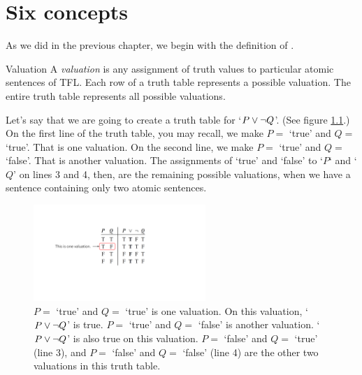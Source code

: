 

\chapter{Six concepts}
\label{s:SemanticConcepts}

As we did in the previous chapter, we begin with the definition of .

\begin{factboxy}{Valuation}
A \textit{valuation} is any assignment of truth values to particular atomic sentences of TFL. Each row of a truth table represents a possible valuation. The entire truth table represents all possible valuations.
\end{factboxy}

Let's say that we are going to create a truth table for `$P \vee {\neg} Q$'. (See figure \ref{fig:valuation}.) On the first line of the truth table, you may recall, we make $P =$ `true' and $Q =$ `true'. That is one valuation. On the second line, we make $P =$ `true' and $Q =$ `false'. That is another valuation. The assignments of `true' and `false' to `$P$` and `$Q$' on lines 3 and 4, then, are the remaining possible valuations, when we have a sentence containing only two atomic sentences.



\begin{figure}
\centering
\includegraphics[width=6.5cm]{this_is_a_valuation.pdf}
\caption{$P =$ `true' and $Q =$ `true' is one valuation. On this valuation, `$P \vee {\neg} Q$' is true. $P =$ `true' and $Q =$ `false' is another valuation. `$P \vee {\neg} Q$' is also true on this valuation. $P =$ `false' and $Q =$ `true' (line 3), and $P =$ `false' and $Q =$ `false' (line 4) are the other two valuations in this truth table.}
\label{fig:valuation}
\end{figure}


